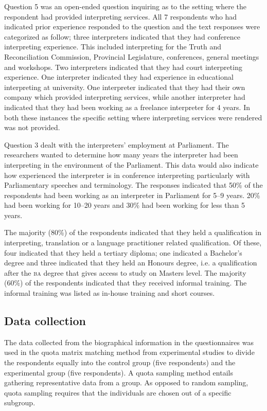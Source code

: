 \documentclass[output=paper]{langsci/langscibook}
\begin{document}
Question 5 was an open-ended question inquiring as to the setting where the respondent had provided interpreting services. All 7 respondents who had indicated prior experience responded to the question and the text responses were categorized as follow; three interpreters indicated that they had conference interpreting experience. This included interpreting for the Truth and Reconciliation Commission, Provincial Legislature, conferences, general meetings and workshops. Two interpreters indicated that they had court interpreting experience. One interpreter indicated they had experience in educational interpreting at university. One interpreter indicated that they had their own company which provided interpreting services, while another interpreter had indicated that they had been working as a freelance interpreter for 4 years. In both these instances the specific setting where interpreting services were rendered was not provided. 

Question 3 dealt with the interpreters’ employment at Parliament. The researchers wanted to determine how many years the interpreter had been interpreting in the environment of the Parliament. This data would also indicate how experienced the interpreter is in conference interpreting particularly with Parliamentary speeches and terminology. The responses indicated that 50\% of the respondents had been working as an interpreter in Parliament for 5--9 years. 20\% had been working for 10--20 years and 30\% had been working for less than 5 years. 

The majority (80\%) of the respondents indicated that they held a qualification in interpreting, translation or a language practitioner related qualification. Of these, four indicated that they held a tertiary diploma; one indicated a Bachelor’s degree and three indicated that they held an Honours degree, i.e. a qualification after the \textsc{ba} degree that gives access to study on Masters level. The majority (60\%) of the respondents indicated that they received informal training. The informal training was listed as in-house training and short courses.  


\subsection{Data collection}
The data collected from the biographical information in the questionnaires was used in the quota matrix matching method from experimental studies to divide the respondents equally into the control group (five respondents) and the experimental group (five respondents). A quota sampling method entails gathering representative data from a group. As opposed to random sampling, quota sampling requires that the individuals are chosen out of a specific subgroup. 
\end{document}
